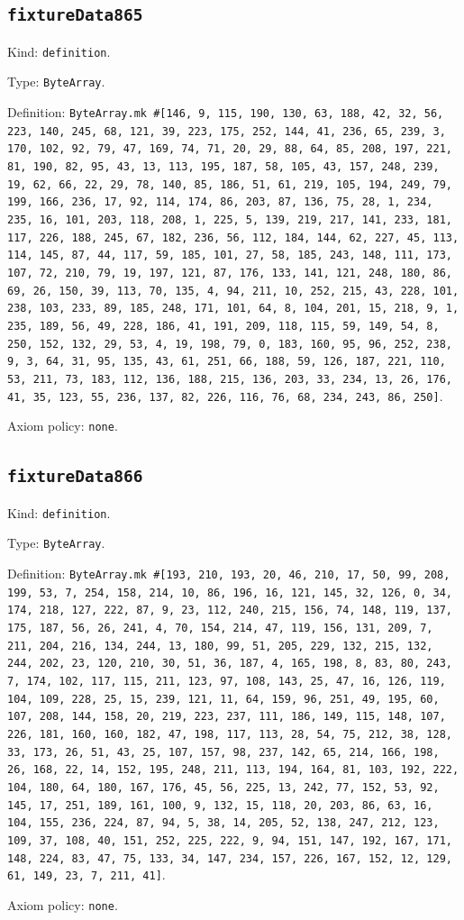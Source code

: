 \documentclass[11pt]{article}
\begin{document}
\subsection*{\texttt{fixtureData865}}
\noindent Kind: \texttt{definition}.\par
\noindent Type: \texttt{ByteArray}.\par
\noindent Definition: \texttt{ByteArray.mk \#[146, 9, 115, 190, 130, 63, 188, 42, 32, 56, 223, 140, 245, 68, 121, 39, 223, 175, 252, 144, 41, 236, 65, 239, 3, 170, 102, 92, 79, 47, 169, 74, 71, 20, 29, 88, 64, 85, 208, 197, 221, 81, 190, 82, 95, 43, 13, 113, 195, 187, 58, 105, 43, 157, 248, 239, 19, 62, 66, 22, 29, 78, 140, 85, 186, 51, 61, 219, 105, 194, 249, 79, 199, 166, 236, 17, 92, 114, 174, 86, 203, 87, 136, 75, 28, 1, 234, 235, 16, 101, 203, 118, 208, 1, 225, 5, 139, 219, 217, 141, 233, 181, 117, 226, 188, 245, 67, 182, 236, 56, 112, 184, 144, 62, 227, 45, 113, 114, 145, 87, 44, 117, 59, 185, 101, 27, 58, 185, 243, 148, 111, 173, 107, 72, 210, 79, 19, 197, 121, 87, 176, 133, 141, 121, 248, 180, 86, 69, 26, 150, 39, 113, 70, 135, 4, 94, 211, 10, 252, 215, 43, 228, 101, 238, 103, 233, 89, 185, 248, 171, 101, 64, 8, 104, 201, 15, 218, 9, 1, 235, 189, 56, 49, 228, 186, 41, 191, 209, 118, 115, 59, 149, 54, 8, 250, 152, 132, 29, 53, 4, 19, 198, 79, 0, 183, 160, 95, 96, 252, 238, 9, 3, 64, 31, 95, 135, 43, 61, 251, 66, 188, 59, 126, 187, 221, 110, 53, 211, 73, 183, 112, 136, 188, 215, 136, 203, 33, 234, 13, 26, 176, 41, 35, 123, 55, 236, 137, 82, 226, 116, 76, 68, 234, 243, 86, 250]}.\par
\noindent Axiom policy: \texttt{none}.\par
\subsection*{\texttt{fixtureData866}}
\noindent Kind: \texttt{definition}.\par
\noindent Type: \texttt{ByteArray}.\par
\noindent Definition: \texttt{ByteArray.mk \#[193, 210, 193, 20, 46, 210, 17, 50, 99, 208, 199, 53, 7, 254, 158, 214, 10, 86, 196, 16, 121, 145, 32, 126, 0, 34, 174, 218, 127, 222, 87, 9, 23, 112, 240, 215, 156, 74, 148, 119, 137, 175, 187, 56, 26, 241, 4, 70, 154, 214, 47, 119, 156, 131, 209, 7, 211, 204, 216, 134, 244, 13, 180, 99, 51, 205, 229, 132, 215, 132, 244, 202, 23, 120, 210, 30, 51, 36, 187, 4, 165, 198, 8, 83, 80, 243, 7, 174, 102, 117, 115, 211, 123, 97, 108, 143, 25, 47, 16, 126, 119, 104, 109, 228, 25, 15, 239, 121, 11, 64, 159, 96, 251, 49, 195, 60, 107, 208, 144, 158, 20, 219, 223, 237, 111, 186, 149, 115, 148, 107, 226, 181, 160, 160, 182, 47, 198, 117, 113, 28, 54, 75, 212, 38, 128, 33, 173, 26, 51, 43, 25, 107, 157, 98, 237, 142, 65, 214, 166, 198, 26, 168, 22, 14, 152, 195, 248, 211, 113, 194, 164, 81, 103, 192, 222, 104, 180, 64, 180, 167, 176, 45, 56, 225, 13, 242, 77, 152, 53, 92, 145, 17, 251, 189, 161, 100, 9, 132, 15, 118, 20, 203, 86, 63, 16, 104, 155, 236, 224, 87, 94, 5, 38, 14, 205, 52, 138, 247, 212, 123, 109, 37, 108, 40, 151, 252, 225, 222, 9, 94, 151, 147, 192, 167, 171, 148, 224, 83, 47, 75, 133, 34, 147, 234, 157, 226, 167, 152, 12, 129, 61, 149, 23, 7, 211, 41]}.\par
\noindent Axiom policy: \texttt{none}.\par
\end{document}

